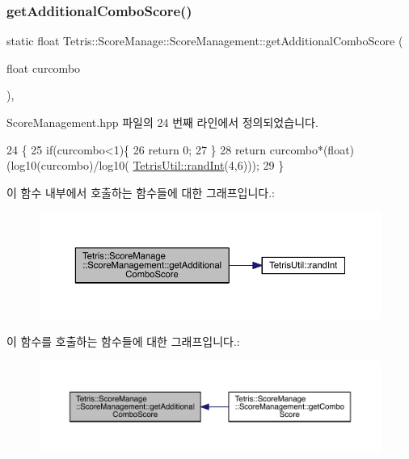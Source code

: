 \subsubsection{\texorpdfstring{get\+Additional\+Combo\+Score()}{getAdditionalComboScore()}}
{\footnotesize\ttfamily static float Tetris\+::\+Score\+Manage\+::\+Score\+Management\+::get\+Additional\+Combo\+Score (\begin{DoxyParamCaption}\item[{float}]{curcombo }\end{DoxyParamCaption})\hspace{0.3cm}{\ttfamily [inline]}, {\ttfamily [static]}}



Score\+Management.\+hpp 파일의 24 번째 라인에서 정의되었습니다.


\begin{DoxyCode}
24                                                                     \{
25                     \textcolor{keywordflow}{if}(curcombo<1)\{
26                         \textcolor{keywordflow}{return} 0;
27                     \}
28                     \textcolor{keywordflow}{return} curcombo*(float)(log10(curcombo)/log10(
      \hyperlink{class_tetris_util_a0a60e809425ddb416a500bcc03cf7061}{TetrisUtil::randInt}(4,6)));
29                 \}
\end{DoxyCode}
이 함수 내부에서 호출하는 함수들에 대한 그래프입니다.\+:
\nopagebreak
\begin{figure}[H]
\begin{center}
\leavevmode
\includegraphics[width=350pt]{d9/d94/class_tetris_1_1_score_manage_1_1_score_management_a66b6a1d3fdc8fb9f91f1d7bfc7854579_cgraph}
\end{center}
\end{figure}
이 함수를 호출하는 함수들에 대한 그래프입니다.\+:
\nopagebreak
\begin{figure}[H]
\begin{center}
\leavevmode
\includegraphics[width=350pt]{d9/d94/class_tetris_1_1_score_manage_1_1_score_management_a66b6a1d3fdc8fb9f91f1d7bfc7854579_icgraph}
\end{center}
\end{figure}
